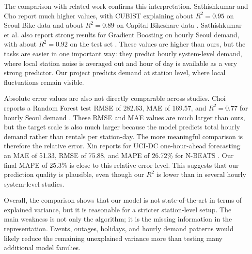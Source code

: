 The comparison with related work confirms this interpretation. 
Sathishkumar and Cho report much higher values, with CUBIST explaining 
about $R^2=0.95$ on Seoul Bike data and about $R^2=0.89$ on Capital 
Bikeshare data \cite{sathishkumar2020rule}. Sathishkumar et al. also 
report strong results for Gradient Boosting on hourly Seoul demand, 
with about $R^2=0.92$ on the test set \cite{sathishkumar2020data}. 
These values are higher than ours, but the tasks are easier in one 
important way: they predict hourly system-level demand, where local 
station noise is averaged out and hour of day is available as a very 
strong predictor. Our project predicts demand at station level, where 
local fluctuations remain visible.

Absolute error values are also not directly comparable across studies. 
Choi reports a Random Forest test RMSE of 282.63, MAE of 169.57, and 
$R^2=0.77$ for hourly Seoul demand \cite{choi2021seoul}. These RMSE and 
MAE values are much larger than ours, but the target scale is also much 
larger because the model predicts total hourly demand rather than 
rentals per station-day. The more meaningful comparison is therefore 
the relative error. Xin reports for UCI-DC one-hour-ahead forecasting 
an MAE of 51.33, RMSE of 75.88, and MAPE of 26.72\% for N-BEATS 
\cite{xin2026probabilistic}. Our final MAPE of 25.3\% is close to this 
relative error level. This suggests that our prediction quality is 
plausible, even though our $R^2$ is lower than in several hourly 
system-level studies.

Overall, the comparison shows that our model is not state-of-the-art 
in terms of explained variance, but it is reasonable for a stricter 
station-level setup. The main weakness is not only the algorithm; it is 
the missing information in the representation. Events, outages, 
holidays, and hourly demand patterns would likely reduce the remaining 
unexplained variance more than testing many additional model families.

